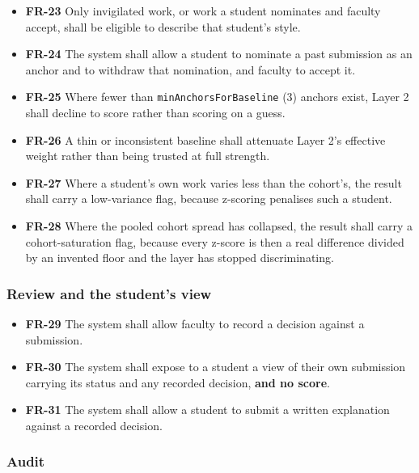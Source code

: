 \begin{itemize}
\tightlist
\item
  \textbf{FR-23} Only invigilated work, or work a student nominates and
  faculty accept, shall be eligible to describe that student's style.
\item
  \textbf{FR-24} The system shall allow a student to nominate a past
  submission as an anchor and to withdraw that nomination, and faculty
  to accept it.
\item
  \textbf{FR-25} Where fewer than \texttt{minAnchorsForBaseline} (3)
  anchors exist, Layer 2 shall decline to score rather than scoring on a
  guess.
\item
  \textbf{FR-26} A thin or inconsistent baseline shall attenuate Layer
  2's effective weight rather than being trusted at full strength.
\item
  \textbf{FR-27} Where a student's own work varies less than the
  cohort's, the result shall carry a low-variance flag, because
  z-scoring penalises such a student.
\item
  \textbf{FR-28} Where the pooled cohort spread has collapsed, the
  result shall carry a cohort-saturation flag, because every z-score is
  then a real difference divided by an invented floor and the layer has
  stopped discriminating.
\end{itemize}

\hypertarget{review-and-the-students-view}{%
\subsubsection{Review and the student's
view}\label{review-and-the-students-view}}

\begin{itemize}
\tightlist
\item
  \textbf{FR-29} The system shall allow faculty to record a decision
  against a submission.
\item
  \textbf{FR-30} The system shall expose to a student a view of their
  own submission carrying its status and any recorded decision,
  \textbf{and no score}.
\item
  \textbf{FR-31} The system shall allow a student to submit a written
  explanation against a recorded decision.
\end{itemize}

\hypertarget{audit}{%
\subsubsection{Audit}\label{audit}}

